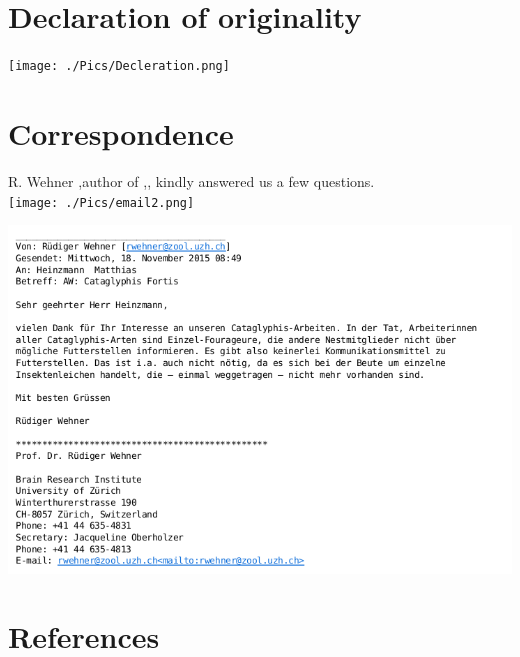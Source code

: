 \documentclass[11pt]{article}
\begin{document}
\newpage
\section{Declaration of originality}
\texttt{[image: ./Pics/Decleration.png]}%

\newpage


\section{Correspondence} \label{Sec:Correspondence}
R. Wehner ,author of \cite{Wehner2003},\cite{Wehner1988}, \cite{Wehner1998} kindly answered us a few questions.\\


\texttt{[image: ./Pics/email2.png]}%

\includegraphics[scale=0.8]{./RWehner.png}%


\section{References}
  

\nocite{Wehner2008}
\nocite{Wehner2003}
\nocite{Wehner1988}
\nocite{GordonTeam2008}
\nocite{Mathworks2015}
\thispagestyle{plain}
\end{document}
